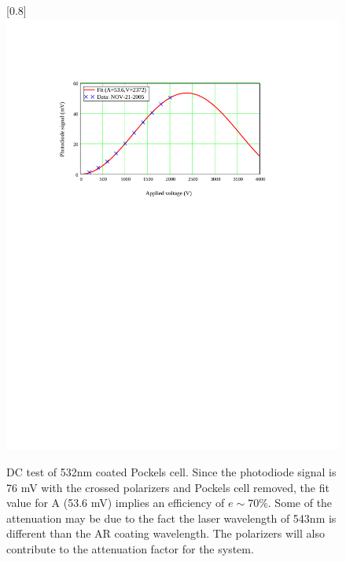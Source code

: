 \begin{figure}
\scalebox{0.8}[0.8]{
\includegraphics[bb=30 460 481 706]
{fit_532/fit_532.pdf}
}
\caption[DC test of 532nm coated Pockels cell]{DC test of 532nm coated Pockels cell. Since the photodiode signal is 76 mV with the crossed polarizers and Pockels cell removed, the fit value for A (53.6 mV) implies an efficiency of $e \sim 70\%$. Some of the attenuation may be due to the fact the laser wavelength of 543nm is different than the AR coating wavelength. The polarizers will also contribute to the attenuation factor for the system.}
\label{fit_532}
\end{figure}

